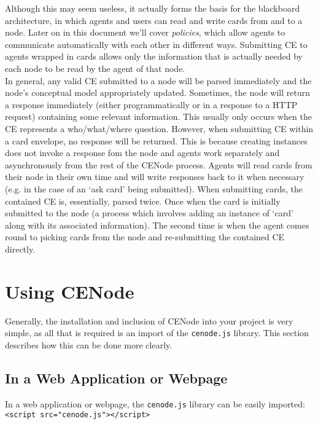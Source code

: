 \documentclass{scrartcl}
\begin{document}
Although this may seem useless, it actually forms the basis for the blackboard architecture, in which agents and users can read and write cards from and to a node. Later on in this document we'll cover \textit{policies}, which allow agents to communicate automatically with each other in different ways. Submitting CE to agents wrapped in cards allows only the information that is actually needed by each node to be read by the agent of that node.\\

In general, any valid CE submitted to a node will be parsed immediately and the node's conceptual model appropriately updated. Sometimes, the node will return a response immediately (either programmatically or in a response to a HTTP request) containing some relevant information. This usually only occurs when the CE represents a who/what/where question. However, when submitting CE within a card envelope, no response will be returned. This is because creating instances does not invoke a response fom the node and agents work separately and asynchronously from the rest of the CENode process. Agents will read cards from their node in their own time and will write responses back to it when necessary (e.g. in the case of an `ask card' being submitted). When submitting cards, the contained CE is, essentially, parsed twice. Once when the card is initially submitted to the node (a process which involves adding an instance of `card' along with its associated information). The second time is when the agent comes round to picking cards from the node and re-submitting the contained CE directly.


\section{Using CENode}
Generally, the installation and inclusion of CENode into your project is very simple, as all that is required is an import of the \texttt{cenode.js} library. This section describes how this can be done more clearly.

\subsection{In a Web Application or Webpage}
\label{as_a_webapp}
In a web application or webpage, the \texttt{cenode.js} library can be easily imported:\\
\texttt{<script src="cenode.js"></script>}\\
\end{document}
